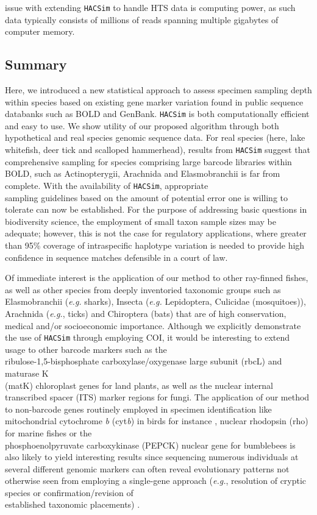 issue with extending {\tt HACSim} to handle HTS data is computing power, as such data typically consists of millions of reads spanning multiple gigabytes of computer memory. 

\subsection{Summary}

Here, we introduced a new statistical approach to assess specimen sampling depth within species based on existing gene marker variation found in public sequence databanks such as BOLD and GenBank. {\tt HACSim} is both computationally efficient and easy to use. We show utility of our proposed algorithm through both hypothetical and real species genomic sequence data. For real species (here, lake whitefish, deer tick and scalloped hammerhead), results from {\tt HACSim} suggest that comprehensive sampling for species comprising large barcode libraries within BOLD, such as Actinopterygii, Arachnida and Elasmobranchii is far from complete. With the availability of {\tt HACSim}, appropriate \\ sampling guidelines based on the amount of potential error one is willing to tolerate can now be established. For the purpose of addressing basic questions in biodiversity science, the employment of small taxon sample sizes may be adequate; however, this is not the case for regulatory applications, where greater than 95\% coverage of intraspecific haplotype variation is needed to provide high confidence in sequence matches defensible in a court of law.      

Of immediate interest is the application of our method to other ray-finned fishes, as well as other species from deeply inventoried taxonomic groups such as Elasmobranchii (\textit{e.g.} sharks), Insecta (\textit{e.g.} Lepidoptera, Culicidae (mosquitoes)), Arachnida (\textit{e.g.}, ticks) and Chiroptera (bats) that are of high conservation, medical and/or socioeconomic importance. Although we explicitly demonstrate the use of {\tt HACSim} through employing COI, it would be interesting to extend usage to other barcode markers such as the \\ ribulose-1,5-bisphosphate carboxylase/oxygenase large subunit (rbcL) and maturase K \\ (matK) chloroplast genes for land plants, as well as the nuclear internal transcribed spacer (ITS) marker regions for fungi. The application of our method to non-barcode genes routinely employed in specimen identification like mitochondrial cytochrome \textit{b} (cyt\textit{b}) in birds for instance \cite{baker2009countering, lavinia2016calibrating}, nuclear rhodopsin (rho) for marine fishes \cite{hanner2011dna} or the \\ phosphoenolpyruvate carboxykinase (PEPCK) nuclear gene for bumblebees \cite{williams2015genes} is also likely to yield interesting results since sequencing numerous individuals at several different genomic markers can often reveal evolutionary patterns not otherwise seen from employing a single-gene approach (\textit{e.g.}, resolution of cryptic species or confirmation/revision of \\ established taxonomic placements) \cite{williams2015genes}. 

